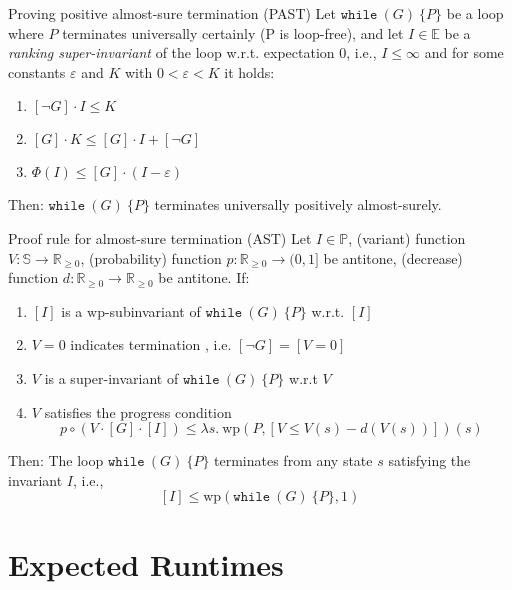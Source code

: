 \documentclass[english]{panikzettel}
\newcommand{\stmtWhile}[2]{\texttt{while}~(#1)~\{ #2 \}}
\newcommand{\lam}[1]{\lambda #1.~}
\renewcommand{\wp}{\mathrm{wp}}
\newcommand{\rel}{\mathbb{R}}
\newcommand{\relg}{\rel_{\geq 0}}
\begin{document}
\begin{theo}{Proving positive almost-sure termination (PAST)}
    Let $\stmtWhile{G}{P}$ be a loop where $P$ terminates universally certainly (P is loop-free), and let $I \in \mathbb{E}$ be a \emph{ranking super-invariant} of the loop w.r.t. expectation $0$, i.e., $I \leq \infty$ and for some constants $\varepsilon$ and $K$ with $0 < \varepsilon < K$ it holds:
    \begin{enumerate}
        \item $[\neg G] \cdot I \leq K$
        \item $[G]\cdot K \leq [G] \cdot I + [\neg G]$
        \item $\Phi(I) \leq [G] \cdot (I - \varepsilon)$
    \end{enumerate}
    Then: $\stmtWhile{G}{P}$ terminates universally positively almost-surely.
\end{theo}

\begin{theo}{Proof rule for almost-sure termination (AST)}
    Let $I \in \mathbb{P}$, (variant) function $V: \mathbb{S} \to \relg$, (probability) function $p: \relg \to (0,1]$ be antitone, (decrease) function $d: \relg \to \relg$ be antitone. If:
    \begin{enumerate}
        \item $[I]$ is a $\wp$-subinvariant of $\stmtWhile{G}{P}$ w.r.t. $[I]$
        \item $V=0$ indicates termination , i.e. $[\neg G]=[V=0]$
        \item $V$ is a super-invariant of $\stmtWhile{G}{P}$ w.r.t $V$
        \item $V$ satisfies the progress condition
            $$p \circ (V \cdot [G] \cdot [I]) \leq \lam{s}\wp(P,[V \leq V(s) -d(V(s))])(s)$$
    \end{enumerate}
    Then: The loop $\stmtWhile{G}{P}$ terminates from any state $s$ satisfying the invariant $I$, i.e.,
        $$[I] \leq \wp(\stmtWhile{G}{P},1)$$
\end{theo}

\section{Expected Runtimes}
\end{document}
